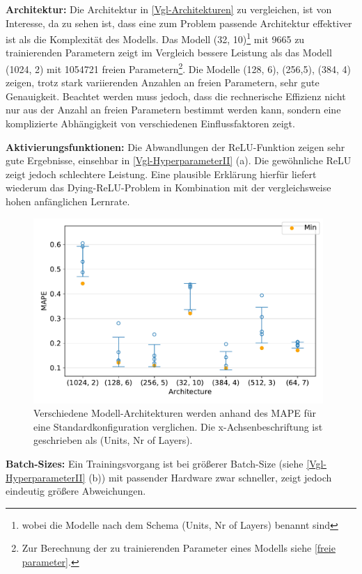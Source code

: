 \textbf{Architektur:}
Die Architektur in \textsf{\autoref{Vgl-Architekturen}} zu vergleichen, ist von Interesse, da zu sehen ist, dass eine zum Problem passende Architektur effektiver ist als die Komplexität des Modells. Das Modell (32, 10)\footnote{wobei die Modelle nach dem Schema (Units, Nr of Layers) benannt sind} mit  9665 zu trainierenden Parametern zeigt im Vergleich bessere Leistung als das Modell (1024, 2) mit 1054721 freien Parametern\footnote{Zur Berechnung der zu trainierenden Parameter eines Modells siehe \textsf{\autoref{freie parameter}}.}. Die Modelle (128, 6), (256,5), (384, 4) zeigen, trotz stark variierenden Anzahlen an freien Parametern, sehr gute Genauigkeit. Beachtet werden muss jedoch, dass die rechnerische Effizienz nicht nur aus der Anzahl an freien Parametern bestimmt werden kann, sondern eine komplizierte Abhängigkeit von verschiedenen Einflussfaktoren zeigt.   


\textbf{Aktivierungsfunktionen:} 
Die Abwandlungen der ReLU-Funktion zeigen sehr gute Ergebnisse, einsehbar in \textsf{\autoref{Vgl-HyperparameterII} (a)}. Die gewöhnliche ReLU zeigt jedoch schlechtere Leistung. Eine plausible Erklärung hierfür liefert wiederum das Dying-ReLU-Problem in Kombination mit der vergleichsweise hohen anfänglichen Lernrate.  
\begin{figure}[bt!]
	\centering
	\captionsetup{justification=justified}
	\includegraphics[width=11cm]{graphics/33-comp}
	\caption{Verschiedene Modell-Architekturen werden anhand des MAPE für eine Standardkonfiguration verglichen. Die
		x-Achsenbeschriftung ist geschrieben als (Units, Nr of Layers).}
	\label{Vgl-Architekturen}
\end{figure}

\textbf{Batch-Sizes:}
Ein Trainingsvorgang ist bei größerer Batch-Size (siehe \textsf{\autoref{Vgl-HyperparameterII} (b)}) mit passender Hardware zwar schneller, zeigt jedoch eindeutig größere Abweichungen.

